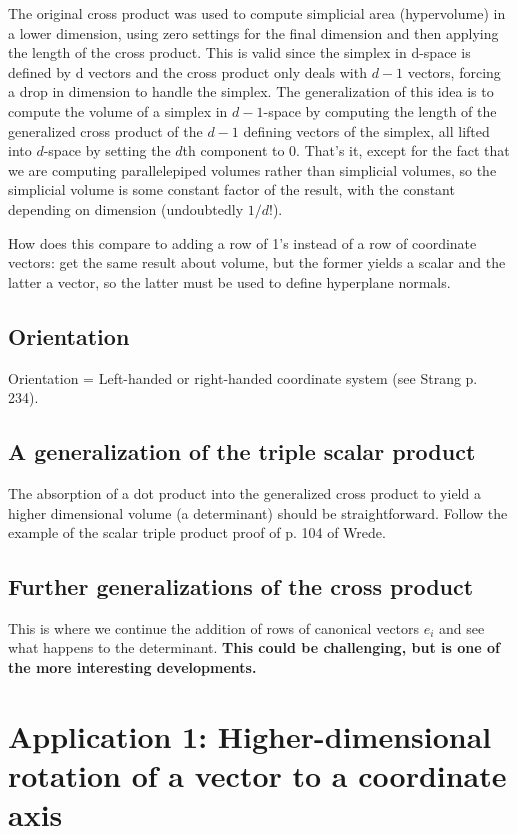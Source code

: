 \documentclass[10pt]{article}
\begin{document}
The original cross product was used to compute simplicial 
area (hypervolume) in a lower dimension, using zero settings for the final dimension and
then applying the length of the cross product.
This is valid since the simplex in d-space is defined by d vectors and the cross product
only deals with $d-1$ vectors, forcing a drop in dimension to handle the simplex.
The generalization of this idea is to compute the volume of a simplex in $d-1$-space
by computing the length of the generalized cross product of the $d-1$ defining vectors
of the simplex, all lifted into $d$-space by setting the $d$th component to 0.
That's it, except for the fact that we are computing parallelepiped volumes rather than
simplicial volumes, so the simplicial volume is some constant factor of the result,
with the constant depending on dimension (undoubtedly $1/d!$).

How does this compare to adding a row of 1's instead of a row of coordinate vectors:
get the same result about volume, but the former yields a scalar and the latter a vector,
so the latter must be used to define hyperplane normals.

\subsection{Orientation}

Orientation = Left-handed or right-handed coordinate system (see Strang p. 234).

\subsection{A generalization of the triple scalar product}

The absorption of a dot product into the generalized cross product
to yield a higher dimensional volume (a determinant) should be straightforward.
Follow the example of the scalar triple product proof of p. 104 of Wrede.

\subsection{Further generalizations of the cross product}

This is where we continue the addition of rows of canonical vectors $e_i$
and see what happens to the determinant.
{\bf This could be challenging, but is one of the more interesting developments.}

\section{Application 1: Higher-dimensional rotation of a vector to a coordinate axis}
\end{document}
